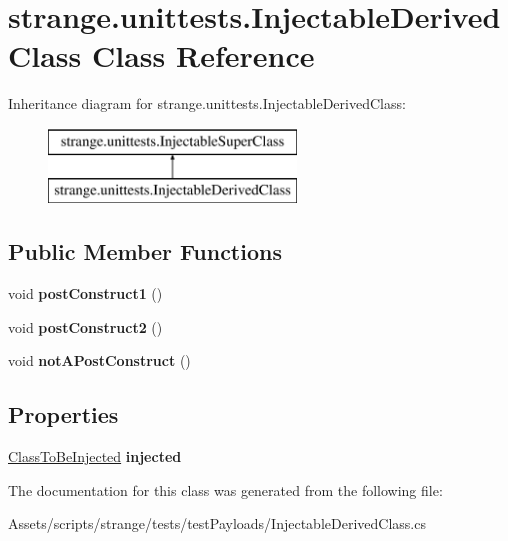 \hypertarget{classstrange_1_1unittests_1_1_injectable_derived_class}{\section{strange.\-unittests.\-Injectable\-Derived\-Class Class Reference}
\label{classstrange_1_1unittests_1_1_injectable_derived_class}
}
Inheritance diagram for strange.\-unittests.\-Injectable\-Derived\-Class\-:\begin{figure}[H]
\begin{center}
\leavevmode
\includegraphics[height=2.000000cm]{classstrange_1_1unittests_1_1_injectable_derived_class}
\end{center}
\end{figure}
\subsection*{Public Member Functions}
\begin{DoxyCompactItemize}
\item 
\hypertarget{classstrange_1_1unittests_1_1_injectable_derived_class_aec3e5d74292f0a39f4492b0b914338aa}{void {\bfseries post\-Construct1} ()}\label{classstrange_1_1unittests_1_1_injectable_derived_class_aec3e5d74292f0a39f4492b0b914338aa}

\item 
\hypertarget{classstrange_1_1unittests_1_1_injectable_derived_class_a7a6d4cd1f134c32d985c7c9ad99345b7}{void {\bfseries post\-Construct2} ()}\label{classstrange_1_1unittests_1_1_injectable_derived_class_a7a6d4cd1f134c32d985c7c9ad99345b7}

\item 
\hypertarget{classstrange_1_1unittests_1_1_injectable_derived_class_aa8ded006b1ac7535b078683e3add1dc8}{void {\bfseries not\-A\-Post\-Construct} ()}\label{classstrange_1_1unittests_1_1_injectable_derived_class_aa8ded006b1ac7535b078683e3add1dc8}

\end{DoxyCompactItemize}
\subsection*{Properties}
\begin{DoxyCompactItemize}
\item 
\hypertarget{classstrange_1_1unittests_1_1_injectable_derived_class_ac42caec17eb385fc55d7a935c2467662}{\hyperlink{classstrange_1_1unittests_1_1_class_to_be_injected}{Class\-To\-Be\-Injected} {\bfseries injected}}\label{classstrange_1_1unittests_1_1_injectable_derived_class_ac42caec17eb385fc55d7a935c2467662}

\end{DoxyCompactItemize}


The documentation for this class was generated from the following file\-:\begin{DoxyCompactItemize}
\item 
Assets/scripts/strange/tests/test\-Payloads/Injectable\-Derived\-Class.\-cs\end{DoxyCompactItemize}
